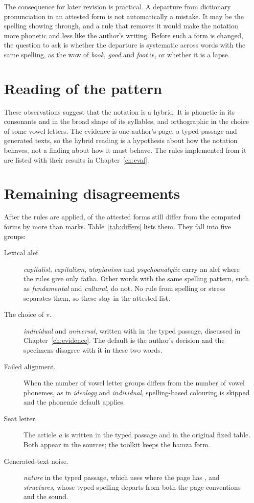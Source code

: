 The consequence for later revision is practical. A departure from dictionary pronunciation in an attested form is not automatically a mistake. It may be the spelling showing through, and a rule that removes it would make the notation more phonetic and less like the author's writing. Before such a form is changed, the question to ask is whether the departure is systematic across words with the same spelling, as the waw of \emph{book}, \emph{good} and \emph{foot} is, or whether it is a lapse.

\section{Reading of the pattern}
These observations suggest that the notation is a hybrid. It is phonetic in its consonants and in the broad shape of its syllables, and orthographic in the choice of some vowel letters. The evidence is one author's page, a typed passage and generated texts, so the hybrid reading is a hypothesis about how the notation behaves, not a finding about how it must behave. The rules implemented from it are listed with their results in Chapter~\ref{ch:eval}.

\section{Remaining disagreements}
After the rules are applied, \NDiffers{} of the \NAttested{} attested forms still differ from the computed forms by more than marks. Table~\ref{tab:differs} lists them. They fall into five groups:
\begin{description}
\item[Lexical alef.] \emph{capitalist}, \emph{capitalism}, \emph{utopianism} and \emph{psychoanalytic} carry an alef where the rules give only fatha. Other words with the same spelling pattern, such as \emph{fundamental} and \emph{cultural}, do not. No rule from spelling or stress separates them, so these stay in the attested list.
\item[The choice of v.] \emph{individual} and \emph{universal}, written with  in the typed passage, discussed in Chapter~\ref{ch:evidence}. The default  is the author's decision and the specimens disagree with it in these two words.
\item[Failed alignment.] When the number of vowel letter groups differs from the number of vowel phonemes, as in \emph{ideology} and \emph{individual}, spelling-based colouring is skipped and the phonemic default applies.
\item[Seat letter.] The article \emph{a} is written  in the typed passage and  in the original fixed table. Both appear in the sources; the toolkit keeps the hamza form.
\item[Generated-text noise.] \emph{nature} in the typed passage, which uses  where the page has , and \emph{structures}, whose typed spelling departs from both the page conventions and the sound.
\end{description}

